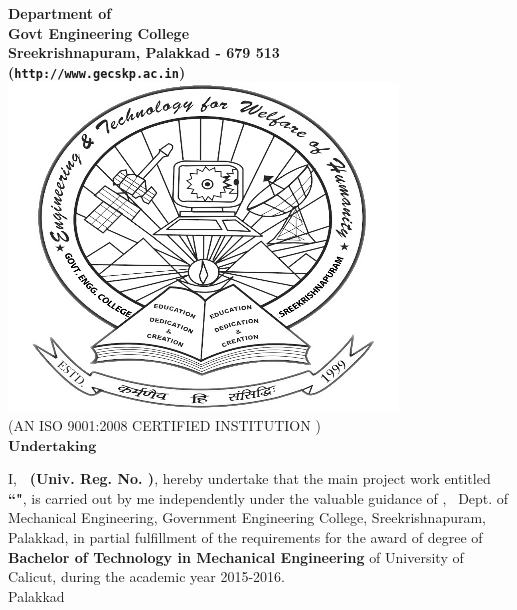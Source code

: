 %
%
%
%


\begin{titlepage}



\begin{center}
	
	
	{\Large \bf Department of \vdept  }\\
	{\Large \bf Govt Engineering College}\\
	{\normalsize \bf Sreekrishnapuram, Palakkad - 679 513\\
		({\tt http://www.gecskp.ac.in})}\\[0.75cm]
	\includegraphics[width=3.5 cm]{geclogo.png}\\
	\scriptsize (AN ISO 9001:2008 CERTIFIED INSTITUTION )\\[1 cm]
	\Huge  $ \textbf{Undertaking}$\\[0.5cm]
\end{center}


%


\quad \quad I, {\bf \vauthor\ (Univ. Reg. No. \vregisternumber)}, hereby undertake that the main project work entitled {\bf ``\vtitle"}, is carried out by me independently under the valuable guidance of {\bf \vguide}, \vguidedg\ Dept. of Mechanical Engineering, Government Engineering College, Sreekrishnapuram, Palakkad, in partial fulfillment of the requirements for the award of degree of {\bf Bachelor of Technology in Mechanical Engineering } of University of Calicut, during the academic year 2015-2016.\\[2 cm]

\noindent Palakkad \hfill  {\bf \vauthor} \\
\vdate 


\end{titlepage}



